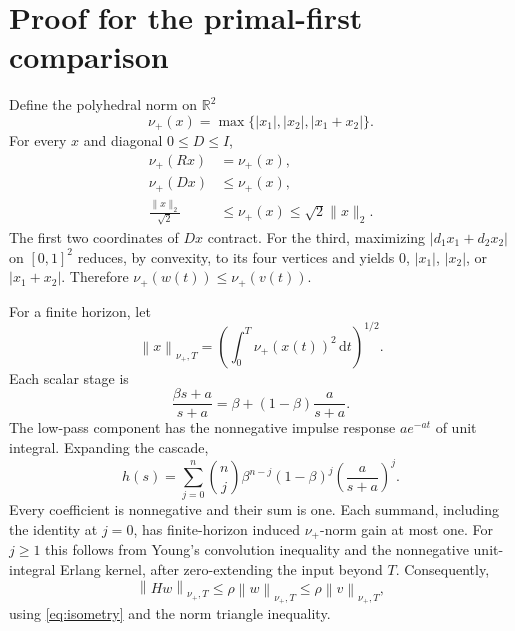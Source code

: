 \documentclass[final,5p,twocolumn]{elsarticle}
\theoremstyle{definition}
\theoremstyle{remark}
\newcommand{\R}{\mathbb{R}}
\newcommand{\Nnorm}[1]{\nu_+\!\left(#1\right)}
\newcommand{\normNT}[1]{\left\lVert #1\right\rVert_{\nu_+,T}}
\begin{document}
\section{Proof for the primal-first comparison}\label{sec:proof}
Define the polyhedral norm on $\R^2$
\begin{equation}\label{eq:poly}
 \Nnorm{x}=\max\{|x_1|,|x_2|,|x_1+x_2|\}.
\end{equation}
For every $x$ and diagonal $0\le D\le I$,
\begin{align}
 \Nnorm{Rx}&=\Nnorm{x},\label{eq:isometry}\\
 \Nnorm{Dx}&\le\Nnorm{x},\label{eq:diagonal}\\
 \frac{\lVert x\rVert_2}{\sqrt2}&\le\Nnorm{x}\le\sqrt2\lVert x\rVert_2.\label{eq:equiv}
\end{align}
The first two coordinates of $Dx$ contract. For the third, maximizing $|d_1x_1+d_2x_2|$ on $[0,1]^2$ reduces, by convexity, to its four vertices and yields $0$, $|x_1|$, $|x_2|$, or $|x_1+x_2|$. Therefore $\Nnorm{w(t)}\le\Nnorm{v(t)}$.

For a finite horizon, let
\begin{equation}
 \normNT{x}=\left(\int_0^T\Nnorm{x(t)}^2\,\mathrm dt\right)^{1/2}.
\end{equation}
Each scalar stage is
\begin{equation}\label{eq:stage}
 \frac{\beta s+a}{s+a}=\beta+(1-\beta)\frac{a}{s+a}.
\end{equation}
The low-pass component has the nonnegative impulse response $ae^{-at}$ of unit integral. Expanding the cascade,
\begin{equation}\label{eq:binomial}
 h(s)=\sum_{j=0}^n\binom nj\beta^{n-j}(1-\beta)^j\left(\frac{a}{s+a}\right)^j.
\end{equation}
Every coefficient is nonnegative and their sum is one. Each summand, including the identity at $j=0$, has finite-horizon induced $\nu_+$-norm gain at most one. For $j\ge1$ this follows from Young's convolution inequality and the nonnegative unit-integral Erlang kernel, after zero-extending the input beyond $T$. Consequently,
\begin{equation}\label{eq:gain}
 \normNT{Hw}\le\rho\normNT{w}\le\rho\normNT{v},
\end{equation}
using \eqref{eq:isometry} and the norm triangle inequality.
\end{document}
